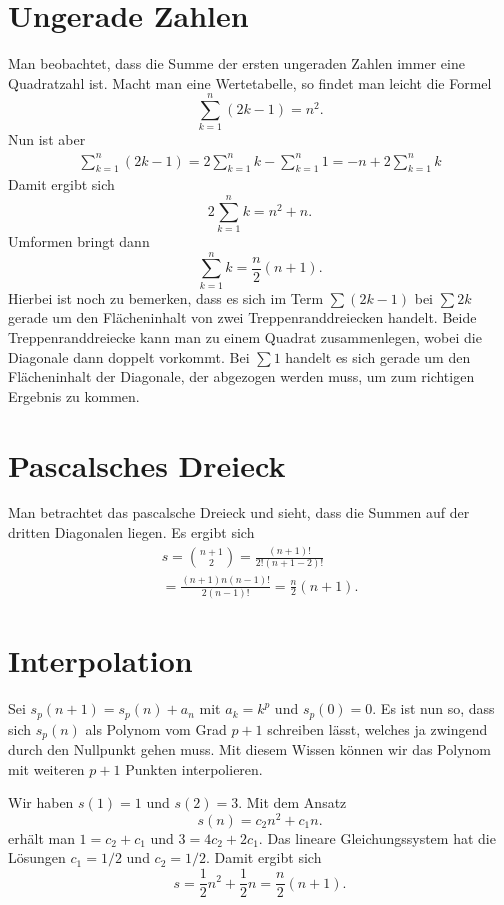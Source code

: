 \documentclass[a4paper,10pt,fleqn,twocolumn,twoside]{article}
\begin{document}
\section{Ungerade Zahlen}

Man beobachtet, dass die Summe der ersten ungeraden Zahlen immer
eine Quadratzahl ist. Macht man eine Wertetabelle, so findet man leicht
die Formel
\[\sum_{k=1}^n (2k-1) = n^2.\]
Nun ist aber
\begin{gather*}
\sum_{k=1}^n (2k-1) = 2\sum_{k=1}^n k - \sum_{k=1}^n 1
= -n+2\sum_{k=1}^n k
\end{gather*}
Damit ergibt sich
\[2\sum_{k=1}^n k = n^2+n.\]
Umformen bringt dann
\[\sum_{k=1}^n k = \frac{n}{2}(n+1).\]
Hierbei ist noch zu bemerken, dass es sich im Term $\sum(2k-1)$ bei
$\sum 2k$ gerade um den Flächeninhalt von zwei Treppenranddreiecken
handelt. Beide Treppenranddreiecke kann man zu einem Quadrat
zusammenlegen, wobei die Diagonale dann doppelt vorkommt. Bei $\sum 1$
handelt es sich gerade um den Flächeninhalt der Diagonale,
der abgezogen werden muss, um zum richtigen Ergebnis zu kommen.


\section{Pascalsches Dreieck}

Man betrachtet das pascalsche Dreieck und sieht, dass
die Summen auf der dritten Diagonalen liegen. Es ergibt sich
\begin{gather*}
s = \binom{n+1}{2} = \frac{(n+1)!}{2!(n+1-2)!}\\
= \frac{(n+1)n(n-1)!}{2(n-1)!} = \frac{n}{2}(n+1).
\end{gather*}


\section{Interpolation}

Sei $s_p(n+1)=s_p(n)+a_n$ mit $a_k=k^p$ und $s_p(0)=0$. Es ist nun so, dass sich $s_p(n)$ als Polynom vom Grad $p+1$ schreiben lässt, welches ja zwingend durch den Nullpunkt gehen muss. Mit diesem Wissen können wir das Polynom mit weiteren $p+1$ Punkten interpolieren.

Wir haben $s(1)=1$ und $s(2)=3$. Mit dem Ansatz
\[s(n)=c_2n^2+c_1n.\]
erhält man $1=c_2+c_1$ und $3=4c_2+2c_1$. Das lineare
Gleichungssystem hat die Lösungen $c_1=1/2$ und $c_2=1/2$.
Damit ergibt sich
\[s=\frac{1}{2}n^2+\frac{1}{2}n = \frac{n}{2}(n+1).\]
\end{document}
